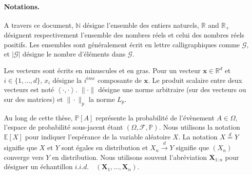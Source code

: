 \documentclass[a4paper, 12pt]{article}
\newcommand{\innerp}[1]{\left\langle #1 \right\rangle}
\newcommand\iid{\ensuremath{\mathit{i.i.d.}}\ }
\def\mb{\mathbf}
\def\P{\mathbb{P}}
\def\PP{\P}
\begin{document}
\paragraph{Notations.}

A travers ce document, $\mathbb{N}$ désigne l'ensemble des entiers naturels, $\mathbb{R}$ and $\mathbb{R}_+$ désignent respectivement l'ensemble des nombres réels et celui des nombres réels positifs. Les ensembles  sont généralement écrit en lettre calligraphiques comme $\mathcal{G}$, et $|\mathcal{G}|$ désigne le nombre d'éléments dans $\mathcal{G}$. 

Les vecteurs sont écrits en minuscules et en gras. Pour un vecteur $\mathbf{x}\in\mathbb{R}^d$ et $i\in \{1,\dots,d\}$, $x_i$ désigne la $i^{ème}$ composante de $\mathbf{x}$. Le produit scalaire entre deux vecteurs est noté $\innerp{\cdot,\cdot}$. $\|\cdot\|$ désigne une norme arbitraire (sur des vecteurs ou sur des matrices) et $\|\cdot\|_p$ la norme $L_p$.

Au long de cette thèse, $\PP[A]$ représente la probabilité de l'évènement $A\in \Omega$, l'espace de probabilité sous-jacent étant $(\Omega, \mathcal{F}, \PP)$. Nous utilisons la notation $\mathbb{E}[X]$ pour indiquer l'espérance de la variable aléatoire $X$. La notation $X \overset{d}{=} Y$ signifie que $X$ et $Y$ sont égales en distribution et $X_n \overset{d}{\to} Y$ signifie que $(X_n)$ converge vers $Y$ en distribution. Nous utilisons souvent l'abréviation $\mb X_{1:n}$ pour désigner un échantillon \iid~$(\mb X_1,\ldots,\mb X_n)$.

\end{document}
